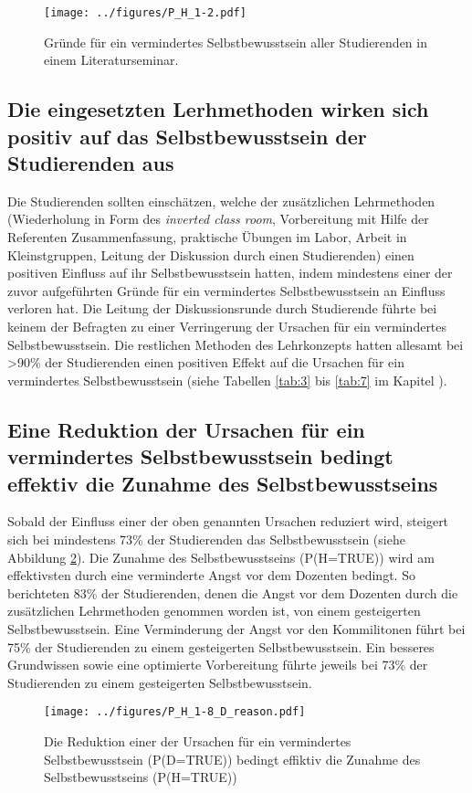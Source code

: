 \begin{figure}[h!]
\begin{center}
	\texttt{[image: ../figures/P\_H\_1-2.pdf]}
\end{center}
	\caption{Gründe für ein vermindertes Selbstbewusstsein aller Studierenden in einem Literaturseminar.}
	\label{fig:P_H_1-2}
\end{figure}

\subsection{Die eingesetzten Lerhmethoden wirken sich positiv auf das Selbstbewusstsein der Studierenden aus}
Die Studierenden sollten einschätzen, welche der  zusätzlichen Lehrmethoden (Wiederholung in Form des {\it inverted class room}, Vorbereitung mit Hilfe der Referenten Zusammenfassung, praktische Übungen im Labor, Arbeit in Kleinstgruppen, Leitung der Diskussion durch einen Studierenden) einen positiven Einfluss auf ihr Selbstbewusstsein hatten, indem mindestens einer der zuvor aufgeführten Gründe für ein vermindertes Selbstbewusstsein an Einfluss verloren hat. Die Leitung der Diskussionsrunde durch Studierende führte bei keinem der Befragten zu einer Verringerung der Ursachen für ein vermindertes Selbstbewusstsein. Die restlichen Methoden des Lehrkonzepts hatten allesamt bei >90\% der Studierenden einen positiven Effekt auf die Ursachen für ein vermindertes Selbstbewusstsein (siehe Tabellen \ref{tab:3} bis \ref{tab:7} im Kapitel ).

\subsection{Eine Reduktion der Ursachen für ein vermindertes Selbstbewusstsein bedingt effektiv die Zunahme des Selbstbewusstseins}\label{chap:effektiveZunahme}
Sobald der Einfluss einer der oben genannten Ursachen reduziert wird, steigert sich bei mindestens 73\% der Studierenden das Selbstbewusstsein (siehe Abbildung \ref{fig:P_H_1-8_D_reason}). Die Zunahme des Selbstbewusstseins (P(H=TRUE)) wird am effektivsten durch eine verminderte Angst vor dem Dozenten bedingt. So berichteten 83\% der Studierenden, denen die Angst vor dem Dozenten durch die zusätzlichen Lehrmethoden genommen worden ist, von einem gesteigerten Selbstbewusstsein. Eine Verminderung der Angst vor den Kommilitonen führt bei 75\% der Studierenden zu einem gesteigerten Selbstbewusstsein. Ein besseres Grundwissen sowie eine optimierte Vorbereitung führte jeweils bei 73\% der Studierenden zu einem gesteigerten Selbstbewusstsein.
\begin{figure}[h!]
\begin{center}
	\texttt{[image: ../figures/P\_H\_1-8\_D\_reason.pdf]}
\end{center}
	\caption{Die Reduktion einer der Ursachen für ein vermindertes Selbstbewusstsein (P(D=TRUE)) bedingt effiktiv die Zunahme des Selbstbewusstseins (P(H=TRUE))}
	\label{fig:P_H_1-8_D_reason}
\end{figure}

